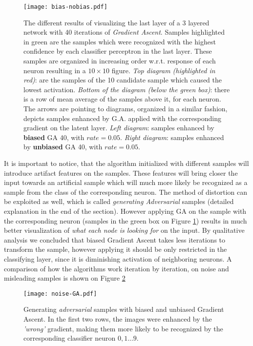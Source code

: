\begin{figure}
    \centering
    \texttt{[image: bias-nobias.pdf]}
    \caption{
        The different results of visualizing the last layer of a 3 layered network with 40 iterations of \emph{Gradient Ascent}. 
        Samples highlighted in green are the samples which were recognized with the highest confidence by each classifier perceptron in the last layer.
        These samples are organized in increasing order w.r.t. response of each neuron resulting in a $10 \times 10$ figure.
        \emph{Top diagram (highlighted in red)}: are the samples of the 10 candidate sample which caused the lowest activation.
        \emph{Bottom of the diagram (below the green box)}: there is a row of mean average of the samples above it, for each neuron.
        The arrows are pointing to diagrams, organized in a similar fashion, depicts samples enhanced by 
            G.A. applied with the corresponding gradient on the latent layer. 
        \emph{Left diagram}: samples enhanced by \textbf{biased} GA 40, with $rate=0.05$.
        \emph{Right diagram}: samples enhanced by \textbf{unbiased} GA 40, with $rate=0.05$.
    }
    \label{fig:bias-nobias}
\end{figure}
It is important to notice, that the algorithm initialized with different samples will introduce artifact features on the samples. 
These features will bring closer the input towards an artificial sample which will much more likely be recognized as a sample from the class of the corresponding neuron. 
The method of distortion can be exploited as well, which is called \emph{generating Adversarial} samples (detailed explanation in the end of the section).
However applying GA on the sample with the corresponding neuron (samples in the green box on Figure \ref{fig:bias-nobias}) results in much better visualization of \emph{what each node is looking for} on the input.
By qualitative analysis we concluded that biased Gradient Ascent takes less iterations to transform the sample, however applying it should be  only restricted in the classifying layer, since it is diminishing activation of neighboring neurons. 
A comparison of how the algorithms work iteration by iteration, on noise and misleading samples is shown on Figure \ref{fig:noise-GA}
    

\begin{figure}
    \centering
    \texttt{[image: noise-GA.pdf]}
    \caption{Generating \emph{adversarial} samples with biased and unbiased Gradient Ascent. 
    In the first two rows, the images were enhanced by the \emph{'wrong'} gradient, making them more likely to be recognized by the corresponding classifier neuron
    $0, 1 ... 9$.
    }
    \label{fig:noise-GA}
\end{figure}

